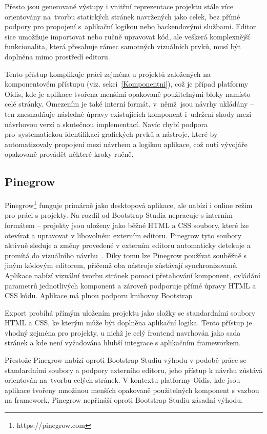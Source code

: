 Přesto jsou generované výstupy i vnitřní reprezentace projektu stále více orientovány na~tvorbu statických stránek navržených jako celek, bez přímé podpory pro propojení s~aplikační logikou nebo backendovými službami. Editor sice umožňuje importovat nebo ručně upravovat kód, ale veškerá komplexnější funkcionalita, která přesahuje rámec samotných vizuálních prvků, musí být doplněna mimo prostředí editoru.

Tento přístup komplikuje práci zejména u projektů založených na komponentovém přístupu (viz. sekci~\ref{Komponentni}), což je případ platformy Oidis, kde je aplikace tvořena menšími opakovaně použitelnými bloky namísto celé stránky. Omezením je také interní formát, v~němž~jsou návrhy ukládány -- ten znesnadňuje následné úpravy existujících komponent i~udržení shody mezi návrhovou verzí a skutečnou implementací. Navíc chybí podpora pro~systematickou identifikaci grafických prvků a nástroje, které by automatizovaly propojení mezi návrhem a logikou aplikace, což nutí vývojáře opakovaně provádět některé kroky ručně.

\subsection{Pinegrow}

Pinegrow\footnote{https://pinegrow.com} funguje primárně jako desktopová aplikace, ale nabízí i online režim pro práci s projekty. Na rozdíl od 
Bootstrap Studia nepracuje s interním formátem -- projekty jsou uloženy jako běžné HTML a CSS soubory, které lze otevírat a upravovat v libovolném externím editoru. Pinegrow tyto soubory aktivně sleduje a změny provedené v externím editoru automaticky detekuje a promítá do vizuálního návrhu~\cite{PinegrowDocs}. Díky tomu lze Pinegrow používat souběžně s jiným kódovým editorem, přičemž oba nástroje zůstávají synchronizované. Aplikace nabízí vizuální tvorbu stránek pomocí přetahování komponent, ovládání parametrů jednotlivých komponent 
a zároveň podporuje přímé úpravy HTML a CSS kódu. Aplikace má plnou 
podporu knihovny Bootstrap~\cite{PinegrowDocs}.

Export probíhá přímým uložením projektu jako složky se standardními soubory HTML a CSS, ke kterým může být doplněna aplikační logika. Tento přístup je vhodný zejména pro projekty, u nichž je celý frontend navrhován jako sada stránek a kde není vyžadována hlubší integrace s aplikačním frameworkem.

Přestože Pinegrow nabízí oproti Bootstrap Studiu výhodu v podobě práce se standardními soubory a podpory externího editoru, jeho přístup k návrhu zůstává orientován na~tvorbu celých stránek. V kontextu platformy Oidis, kde jsou aplikace tvořeny množinou menších opakovaně použitelných komponent s vazbou na framework, Pinegrow nepřináší oproti Bootstrap Studiu zásadní výhodu.


